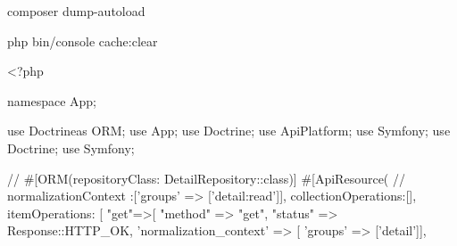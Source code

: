 composer dump-autoload

php bin/console cache:clear



<?php

namespace App\Entity;

use Doctrine\ORM\Mapping as ORM;
use App\Repository\DetailRepository;
use Doctrine\Common\Collections\Collection;
use ApiPlatform\Core\Annotation\ApiResource;
use Symfony\Component\HttpFoundation\Response;
use Doctrine\Common\Collections\ArrayCollection;
use Symfony\Component\Serializer\Annotation\Groups;

// #[ORM\Entity(repositoryClass: DetailRepository::class)]
#[ApiResource(
    // normalizationContext :['groups' => ['detail:read']],
    collectionOperations:[],
    itemOperations: [
        "get"=>[
            "method" => "get",
            "status" => Response::HTTP_OK,
            'normalization_context' => [ 'groups' => ['detail']],
                
